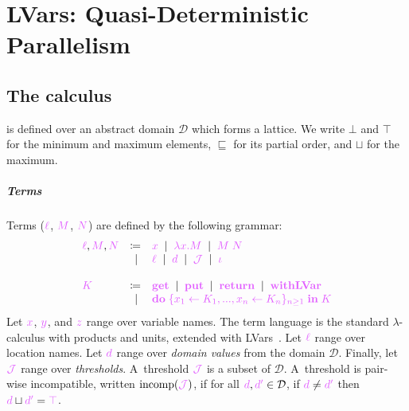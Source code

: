 \documentclass[main.tex]{subfiles}
\begin{document}


\chapter{LVars: Quasi-Deterministic Parallelism}

\section[The Lambda LVar calculus]{The \lambdalvar calculus}

\lambdalvar is defined over an abstract domain $\mathcal{D}$ which forms a lattice. We write $\bot$ and $\top$ for the minimum and maximum elements, $\sqsubseteq$ for its partial order, and $\sqcup$ for the maximum.

\paragraph*{Terms}
Terms ($\tm{\ell}$, $\tm{M}$, $\tm{N}$) are defined by the following grammar:
\[
  \begin{array}{lrll}
  \tm{\ell}, \tm{M}, \tm{N}
  & \coloneqq & \tm{x}
     \sep        \tm{\lambda x.M}
     \sep        \tm{M\;N}   \\
  & \sep      & \tm{\ell}
      \sep        \tm{d}
       \sep        \tmJ
       \sep       \tm{\iota}
  \\
  \\
   \tm{K}
  & \coloneqq & \tm{\lvarget}
    \sep        \tm{\lvarput}
    \sep        \tm{\return}
    \sep        \tm{\lvarrun} \\
    & \sep &        \tm{\doh{K_1}{K_n}{K}}
\end{array}
\]
Let $\tm{x}$, $\tm{y}$, and $\tm{z}$ range over variable names. The term language is the standard $\lambda$-calculus with products and units, extended with LVars~\cite{kuper15}. Let $\tm{\ell}$ range over location names. Let $\tm{d}$ range over \emph{domain values} from the domain $\mathcal{D}$. Finally, let $\tmJ$ range over \emph{thresholds}. A~threshold $\tmJ$ is a subset of $\mathcal{D}$. A~threshold is pair-wise incompatible, written $\incomp(\tmJ)$, if for all $\tm{d},\tm{d'}\in\mathcal{D}$, if $\tm{d}\neq\tm{d'}$ then $\tm{d}\sqcup\tm{d'}=\tm{\top}$.
\end{document}
